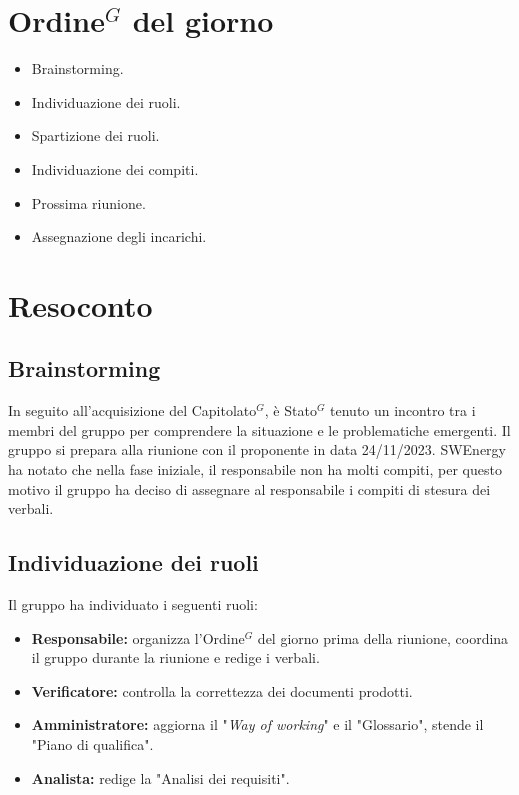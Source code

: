 \section{\gls{Ordine}$^G$ del giorno}
\begin{itemize}
	\item Brainstorming.
	\item Individuazione dei ruoli.
	\item Spartizione dei ruoli.
	\item Individuazione dei compiti.
	\item Prossima riunione.
	\item Assegnazione degli incarichi.
\end{itemize}

\section{Resoconto}

\subsection{Brainstorming}
In seguito all'acquisizione del \gls{Capitolato}$^G$, è \gls{Stato}$^G$ tenuto un incontro tra i
membri del gruppo per comprendere la situazione e le problematiche emergenti.
Il gruppo si prepara alla riunione con il proponente in data 24/11/2023.
SWEnergy ha notato che nella fase iniziale, il responsabile non ha molti
compiti, per questo motivo il gruppo ha deciso di assegnare al responsabile
i compiti di stesura dei verbali.

\subsection{Individuazione dei ruoli}
Il gruppo ha individuato i seguenti ruoli:
\begin{itemize}
	\item \textbf{Responsabile:} organizza l'\gls{Ordine}$^G$ del giorno prima della
	      riunione, coordina il gruppo durante la riunione e redige i verbali.

	\item \textbf{Verificatore:} controlla la correttezza dei documenti prodotti.

	\item \textbf{Amministratore:} aggiorna il "\textit{Way of working}" e il
	      "Glossario", stende il "Piano di qualifica".

	\item \textbf{Analista:} redige la "Analisi dei requisiti".
\end{itemize}

